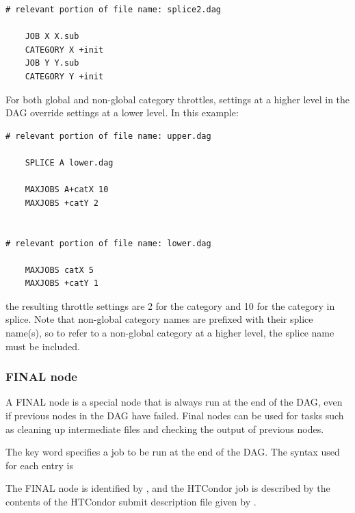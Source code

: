 \begin{verbatim}
# relevant portion of file name: splice2.dag

    JOB X X.sub
    CATEGORY X +init
    JOB Y Y.sub
    CATEGORY Y +init

\end{verbatim}

For both global and non-global category throttles, settings at a higher
level in the DAG override settings at a lower level.
In this example:

\begin{verbatim}
# relevant portion of file name: upper.dag

    SPLICE A lower.dag

    MAXJOBS A+catX 10
    MAXJOBS +catY 2


# relevant portion of file name: lower.dag

    MAXJOBS catX 5
    MAXJOBS +catY 1

\end{verbatim}

the resulting throttle settings are 2 for the  category
and 10 for the  category in splice.
Note that non-global category names are
prefixed with their splice name(s), so to refer to a non-global category 
at a higher level, the splice name must be included.


\subsubsection{\label{sec:DAGFinalNode}FINAL node}

A FINAL node is a special node that is always run at the end of the DAG,
even if previous nodes in the DAG have failed.  Final nodes can be used
for tasks such as cleaning up intermediate files and checking the output
of previous nodes.

The  key word specifies a job to be run at the end of
the DAG.  The syntax used for each  entry is

  
 

The FINAL node is identified by , and the HTCondor job
is described by the contents of the HTCondor submit description file
given by .

